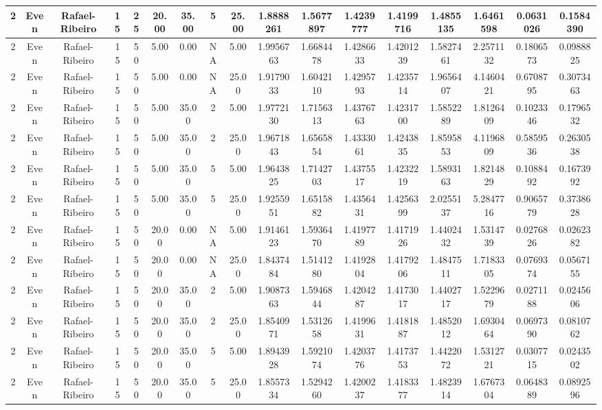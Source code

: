 \begin{longtable}{ | c | c | c | c | c | c | c | c | c | c | c | c | c | c | c | c | c | }
	\hline
	2	&	Even	&	Rafael-Ribeiro	&	15	&	25	&	20.00	&	35.00	&	5	&	25.00	&	1.8888261	&	1.5677897	&	1.4239777	&	1.4199716	&	1.4855135	&	1.6461598	&	0.0631026	&	0.1584390 \\
	\hline
	2	&	Even	&	Rafael-Ribeiro	&	15	&	50	&	5.00	&	0.00	&	NA	&	5.00	&	1.9956763	&	1.6684478	&	1.4286633	&	1.4201239	&	1.5827461	&	2.2571132	&	0.1806573	&	0.0988825 \\
	\hline
	2	&	Even	&	Rafael-Ribeiro	&	15	&	50	&	5.00	&	0.00	&	NA	&	25.00	&	1.9179033	&	1.6042110	&	1.4295793	&	1.4235714	&	1.9656407	&	4.1460421	&	0.6708795	&	0.3073463 \\
	\hline
	2	&	Even	&	Rafael-Ribeiro	&	15	&	50	&	5.00	&	35.00	&	2	&	5.00	&	1.9772130	&	1.7156313	&	1.4376763	&	1.4231700	&	1.5852289	&	1.8126409	&	0.1023346	&	0.1796532 \\
	\hline
	2	&	Even	&	Rafael-Ribeiro	&	15	&	50	&	5.00	&	35.00	&	2	&	25.00	&	1.9671843	&	1.6565854	&	1.4333061	&	1.4243835	&	1.8595853	&	4.1196809	&	0.5859536	&	0.2630538 \\
	\hline
	2	&	Even	&	Rafael-Ribeiro	&	15	&	50	&	5.00	&	35.00	&	5	&	5.00	&	1.9643825	&	1.7142703	&	1.4375517	&	1.4232219	&	1.5893163	&	1.8214829	&	0.1088492	&	0.1673992 \\
	\hline
	2	&	Even	&	Rafael-Ribeiro	&	15	&	50	&	5.00	&	35.00	&	5	&	25.00	&	1.9255951	&	1.6515882	&	1.4356431	&	1.4256399	&	2.0255137	&	5.2847716	&	0.9065779	&	0.3738628 \\
	\hline
	2	&	Even	&	Rafael-Ribeiro	&	15	&	50	&	20.00	&	0.00	&	NA	&	5.00	&	1.9146123	&	1.5936470	&	1.4197789	&	1.4171926	&	1.4402432	&	1.5314739	&	0.0276826	&	0.0262382 \\
	\hline
	2	&	Even	&	Rafael-Ribeiro	&	15	&	50	&	20.00	&	0.00	&	NA	&	25.00	&	1.8437484	&	1.5141280	&	1.4192804	&	1.4179206	&	1.4847511	&	1.7183305	&	0.0769374	&	0.0567155 \\
	\hline
	2	&	Even	&	Rafael-Ribeiro	&	15	&	50	&	20.00	&	35.00	&	2	&	5.00	&	1.9087363	&	1.5946844	&	1.4204287	&	1.4173017	&	1.4402717	&	1.5229679	&	0.0271188	&	0.0245606 \\
	\hline
	2	&	Even	&	Rafael-Ribeiro	&	15	&	50	&	20.00	&	35.00	&	2	&	25.00	&	1.8540971	&	1.5312658	&	1.4199631	&	1.4181887	&	1.4852012	&	1.6930464	&	0.0697390	&	0.0810762 \\
	\hline
	2	&	Even	&	Rafael-Ribeiro	&	15	&	50	&	20.00	&	35.00	&	5	&	5.00	&	1.8943928	&	1.5921074	&	1.4203776	&	1.4173753	&	1.4422072	&	1.5312721	&	0.0307715	&	0.0243502 \\
	\hline
	2	&	Even	&	Rafael-Ribeiro	&	15	&	50	&	20.00	&	35.00	&	5	&	25.00	&	1.8557334	&	1.5294260	&	1.4200237	&	1.4183377	&	1.4823914	&	1.6767304	&	0.0648389	&	0.0892596 \\

\end{longtable}
